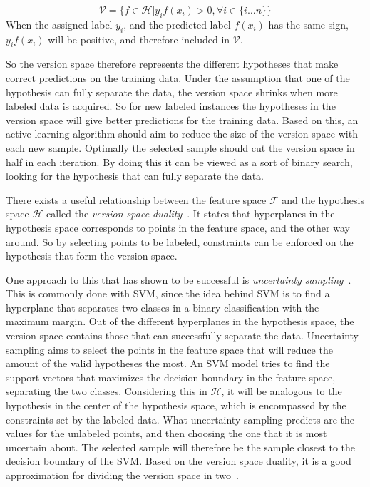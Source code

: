\begin{equation}\label{eq:version-space}
    \mathcal{V} = \Big \{ f \in \mathcal{H} \Big | y_i f(x_i) > 0, \forall i \in \{i \dots n\} \Big \}
\end{equation}
When the assigned label $y_i$, and the predicted label $f(x_i)$ has the same sign, $y_i f(x_i)$ will be positive, and therefore included in $\mathcal{V}$.

So the version space therefore represents the different hypotheses that make correct predictions on the training data.
Under the assumption that one of the hypothesis can fully separate the data, the version space shrinks when more labeled data is acquired.
So for new labeled instances the hypotheses in the version space will give better predictions for the training data.
Based on this, an active learning algorithm should aim to reduce the size of the version space with each new sample. 
Optimally the selected sample should cut the version space in half in each iteration.
By doing this it can be viewed as a sort of binary search, looking for the hypothesis that can fully separate the data.

There exists a useful relationship between the feature space $\mathcal{F}$ and the hypothesis space $\mathcal{H}$ called the \textit{version space duality}~\cite{tong2001support, vapnik1998statistical}.
It states that hyperplanes in the hypothesis space corresponds to points in the feature space, and the other way around.
So by selecting points to be labeled, constraints can be enforced on the hypothesis that form the version space.

One approach to this that has shown to be successful is \textit{uncertainty sampling}~\cite{settles2012active}.
This is commonly done with SVM, since the idea behind SVM is to find a hyperplane that separates two classes in a binary classification with the maximum margin.
Out of the different hyperplanes in the hypothesis space, the version space contains those that can successfully separate the data.
Uncertainty sampling aims to select the points in the feature space that will reduce the amount of the valid hypotheses the most.
An SVM model tries to find the support vectors that maximizes the decision boundary in the feature space, separating the two classes.
Considering this in $\mathcal{H}$, it will be analogous to the hypothesis in the center of the hypothesis space, which is encompassed by the constraints set by the labeled data.
What uncertainty sampling predicts are the values for the unlabeled points, and then choosing the one that it is most uncertain about.
The selected sample will therefore be the sample closest to the decision boundary of the SVM.
Based on the version space duality, it is a good approximation for dividing the version space in two~\cite{settles2012active}.


